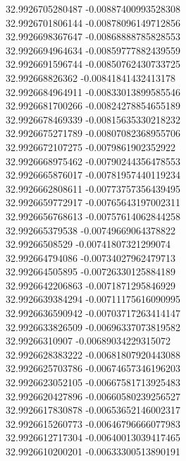 {32.9926705280487	-0.00887400993528308\\
32.9926701806144	-0.00878096149712856\\
32.9926698367647	-0.00868888785828553\\
32.9926694964634	-0.00859777882439559\\
32.9926691596744	-0.00850762430733725\\
32.992668826362	-0.00841841432413178\\
32.9926684964911	-0.00833013899585546\\
32.9926681700266	-0.00824278854655189\\
32.9926678469339	-0.00815635330218232\\
32.9926675271789	-0.00807082368955706\\
32.9926672107275	-0.0079861902352922\\
32.9926668975462	-0.00790244356478553\\
32.9926665876017	-0.00781957440119234\\
32.9926662808611	-0.00773757356439495\\
32.9926659772917	-0.00765643197002311\\
32.9926656768613	-0.00757614062844258\\
32.992665379538	-0.00749669064378822\\
32.99266508529	-0.00741807321299074\\
32.992664794086	-0.00734027962479713\\
32.992664505895	-0.00726330125884189\\
32.9926642206863	-0.0071871295846929\\
32.9926639384294	-0.00711175616090995\\
32.9926636590942	-0.00703717263414147\\
32.9926633826509	-0.00696337073819582\\
32.99266310907	-0.00689034229315072\\
32.9926628383222	-0.00681807920443088\\
32.9926625703786	-0.00674657346196203\\
32.9926623052105	-0.00667581713925483\\
32.9926620427896	-0.00660580239256527\\
32.9926617830878	-0.00653652146002317\\
32.9926615260773	-0.00646796666077983\\
32.9926612717304	-0.00640013039417465\\
32.9926610200201	-0.00633300513890191\\
}
